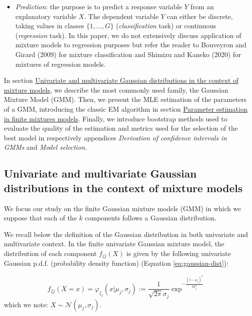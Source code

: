 \begin{itemize}
\tightlist
\item
  \emph{Prediction}: the purpose is to predict a response variable \(Y\) from
  an explanatory variable \(X\). The dependent variable \(Y\) can either
  be discrete, taking values in classes \(\{1, \ldots, G\}\)
  (\emph{classification} task) or continuous (\emph{regression} task). In this
  paper, we do not extensively discuss application of mixture models to regression purposes but refer the reader
  to Bouveyron and Girard (2009) for mixture classification and
  Shimizu and Kaneko (2020) for mixtures of regression models.
\end{itemize}

In section \protect\hyperlink{univariate-and-multivariate-gaussian-distributions-in-the-context-of-mixture-models}{Univariate and multivariate Gaussian distributions in the context of mixture models}, we describe the most
commonly used family, the Gaussian Mixture Model (GMM). Then, we present
the MLE estimation of the parameters of a GMM, introducing the classic
EM algorithm in section \protect\hyperlink{parameter-estimation-in-finite-mixtures-models}{Parameter estimation in finite mixtures models}. Finally, we introduce bootstrap methods used to evaluate the
quality of the estimation and metrics used for the selection of the best
model in respectively appendices \emph{Derivation of confidence intervals in GMMs} and \emph{Model selection}.

\hypertarget{univariate-and-multivariate-gaussian-distributions-in-the-context-of-mixture-models}{%
\subsection{Univariate and multivariate Gaussian distributions in the context of mixture models}\label{univariate-and-multivariate-gaussian-distributions-in-the-context-of-mixture-models}}

We focus our study on the finite Gaussian mixture models (GMM) in which we
suppose that each of the \(k\) components follows a Gaussian
distribution.

We recall below the definition of the Gaussian
distribution in both univariate and multivariate context. In the finite univariate Gaussian mixture model, the distribution of
each component \(f_{\zeta j}(X)\) is given by the following univariate
Gaussian p.d.f. (probability density function) (Equation
\eqref{eq:gaussian-dist}):

\begin{equation}
f_{\zeta j}(X=x)=\varphi_{\zeta_j}(x | \mu_j, \sigma_j):=\frac{1}{\sqrt{2\pi} \sigma_j} \exp^{- \frac{(x - \mu_j)^2}{2 \sigma_j^2}}
\label{eq:gaussian-dist}
\end{equation} which we note: \(X \sim \mathcal{N}(\mu_j, \sigma_j)\).

